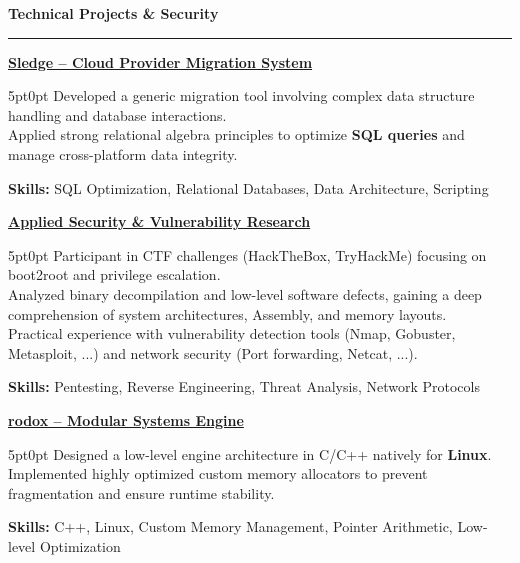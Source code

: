 \documentclass[9pt]{extarticle}
\begin{document}
\par\vspace{5pt}

{\large\bfseries Technical Projects \& Security}
\par\vspace{-8pt}
\rule{\linewidth}{0.4pt}
\par\vspace{5pt}

\underline{\bfseries Sledge -- Cloud Provider Migration System}
\par
\begin{adjustwidth}{5pt}{0pt}
    Developed a generic migration tool involving complex data structure handling and database interactions. \\
    Applied strong relational algebra principles to optimize {\bfseries SQL queries} and manage cross-platform data integrity.
\end{adjustwidth}
\par
{\bfseries Skills:} SQL Optimization, Relational Databases, Data Architecture, Scripting

\par\vspace{8pt}

\underline{\bfseries Applied Security \& Vulnerability Research}
\par
\begin{adjustwidth}{5pt}{0pt}
    Participant in CTF challenges (HackTheBox, TryHackMe) focusing on boot2root and privilege escalation. \\
    Analyzed binary decompilation and low-level software defects, gaining a deep comprehension of system architectures, Assembly, and memory layouts. \\
    Practical experience with vulnerability detection tools (Nmap, Gobuster, Metasploit, ...) and network security (Port forwarding, Netcat, ...).
\end{adjustwidth}
\par
{\bfseries Skills:} Pentesting, Reverse Engineering, Threat Analysis, Network Protocols

\par\vspace{8pt}

\underline{\bfseries rodox -- Modular Systems Engine}
\par
\begin{adjustwidth}{5pt}{0pt}
    Designed a low-level engine architecture in C/C++ natively for {\bfseries Linux}. \\
    Implemented highly optimized custom memory allocators to prevent fragmentation and ensure runtime stability.
\end{adjustwidth}
\par
{\bfseries Skills:} C++, Linux, Custom Memory Management, Pointer Arithmetic, Low-level Optimization
\end{document}
